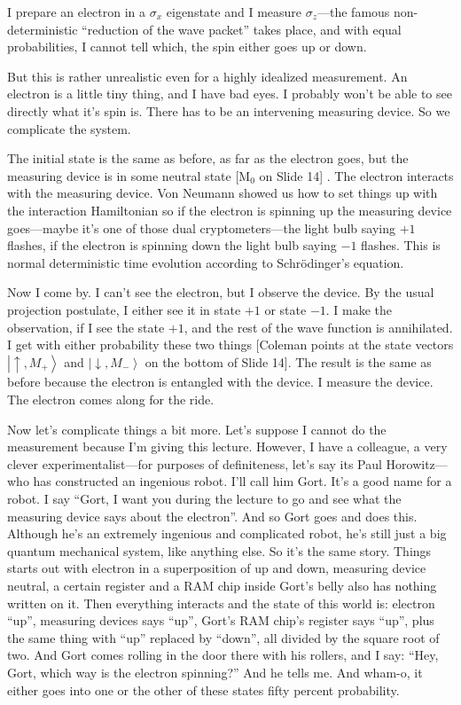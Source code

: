 \documentclass[12pt,nofootinbib]{revtex4}
\newcommand{\ket}[1]{\left|#1\right\rangle}
\newcommand{\up}{\uparrow}
\newcommand{\dw}{\downarrow}
\begin{document}
I prepare an electron in a $\sigma_x$ eigenstate and I measure $\sigma_z$---the famous non-deterministic ``reduction of the wave packet'' takes place, and with equal probabilities, I cannot tell which, the spin either goes up or down.

But this is rather unrealistic even for a highly idealized measurement. An electron is a little tiny thing, and I have bad eyes. I probably won't be able to see directly what it's spin is. There has to be an intervening measuring device. So we complicate the system.

The initial state is the same as before, as far as the electron goes, but the measuring device is in some neutral state [M$_0$ on Slide 14]%
. The electron interacts with the measuring device. Von Neumann showed us how to set things up with the interaction Hamiltonian so if the electron is spinning up the measuring device goes---maybe it's one of those dual cryptometers---the light bulb saying $+1$ flashes, if the electron is spinning down the light bulb saying $-1$ flashes. This is normal deterministic time evolution according to Schrödinger's equation.

Now I come by. I can't see the electron, but I observe the device. By the usual projection postulate, I either see it in state $+1$ or state $-1$. I make the observation, if I see the state $+1$, and the rest of the wave function is annihilated. I get with either probability these two things [Coleman points at the state vectors $\ket{\up,M_+}$ and $\ket{\dw,M_-}$ on the bottom of Slide 14].  The result is the same as before because the electron is entangled with the device. I measure the device. The electron comes along for the ride.

Now let's complicate things a bit more. Let's suppose I cannot do the measurement because I'm giving this lecture. However, I have a colleague, a very clever experimentalist---for purposes of definiteness, let's say its Paul Horowitz---who has constructed an ingenious robot. I'll call him Gort. It's a good name for a robot. I say ``Gort, I want you during the lecture to go and see what the measuring device says about the electron''. And so Gort goes and does this. Although he's an extremely ingenious and complicated robot, he's still just a big quantum mechanical system, like anything else. So it's the same story. Things starts out with electron in a superposition of up and down, %
measuring device neutral, a certain register and a RAM chip inside Gort's belly also has nothing written on it. Then everything interacts and the state of this world is: electron ``up'', measuring devices says ``up'', Gort's RAM chip's register says ``up'', plus the same thing with ``up'' replaced by ``down'', all divided by the square root of two. And Gort comes rolling in the door there with his rollers, and I say: ``Hey, Gort, which way is the electron spinning?'' And he tells me. And wham-o, it either goes into one or the other of these states fifty percent probability.
\end{document}
